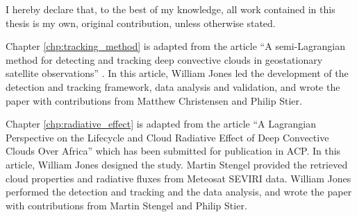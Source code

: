 \begin{originality}

I hereby declare that, to the best of my knowledge, all work contained in this thesis is my own, original contribution, unless otherwise stated.

Chapter \ref{chp:tracking_method} is adapted from the article ``A semi-Lagrangian method for detecting and tracking deep convective clouds in geostationary satellite observations'' \citep{jones_semi-lagrangian_2023}. In this article, William Jones led the development of the detection and tracking framework, data analysis and validation, and wrote the paper with contributions from Matthew Christensen and Philip Stier.

Chapter \ref{chp:radiative_effect} is adapted from the article ``A Lagrangian Perspective on the Lifecycle and Cloud Radiative Effect of Deep Convective Clouds Over Africa'' which has been submitted for publication in ACP. In this article, William Jones designed the study. Martin Stengel provided the retrieved cloud properties and radiative fluxes from Meteosat SEVIRI data. William Jones performed the detection and tracking and the data analysis, and wrote the paper with contributions from Martin Stengel and Philip Stier.

\end{originality}
